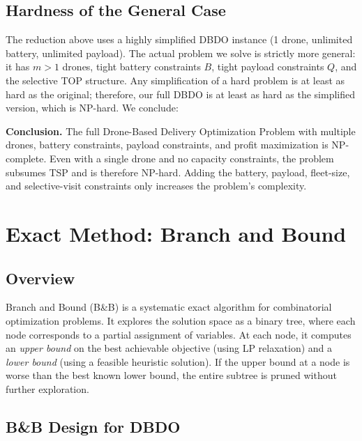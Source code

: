 \documentclass[12pt,a4paper]{article}
\begin{document}
\subsection{Hardness of the General Case}

The reduction above uses a highly simplified DBDO instance (1 drone, unlimited battery,
unlimited payload). The actual problem we solve is strictly more general: it has
$m > 1$ drones, tight battery constraints $B$, tight payload constraints $Q$, and the
selective TOP structure. Any simplification of a hard problem is at least as hard as the
original; therefore, our full DBDO is at least as hard as the simplified version, which
is NP-hard. We conclude:

\begin{tcolorbox}[colback=boxgray,colframe=deepblue]
\textbf{Conclusion.} The full Drone-Based Delivery Optimization Problem with multiple
drones, battery constraints, payload constraints, and profit maximization is NP-complete.
Even with a single drone and no capacity constraints, the problem subsumes TSP and is
therefore NP-hard. Adding the battery, payload, fleet-size, and selective-visit
constraints only increases the problem's complexity.
\end{tcolorbox}

\section{Exact Method: Branch and Bound}

\subsection{Overview}

Branch and Bound (B\&B) is a systematic exact algorithm for combinatorial optimization
problems. It explores the solution space as a binary tree, where each node corresponds
to a partial assignment of variables. At each node, it computes an \emph{upper bound}
on the best achievable objective (using LP relaxation) and a \emph{lower bound} (using
a feasible heuristic solution). If the upper bound at a node is worse than the best
known lower bound, the entire subtree is pruned without further exploration.

\subsection{B\&B Design for DBDO}
\end{document}

